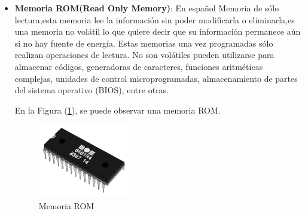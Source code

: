\documentclass{article}
\begin{document}
\begin{itemize}
    
    
    \item \textbf{Memoria ROM(Read Only Memory)}: En español Memoria de sólo lectura,esta memoria lee la información sin poder modificarla o eliminarla,es una memoria no volátil lo que quiere decir que su información permanece aún si no hay fuente de energía.\newline
    Estas memorias una vez programadas sólo realizan operaciones de lectura. No son volátiles pueden utilizarse para almacenar códigos, generadoras de caracteres, funciones aritméticas complejas, unidades de control microprogramadas, almacenamiento de partes del sistema operativo (BIOS), entre otras\cite{refUNT}.
    
    En la Figura (\ref{fig:rom}), se puede observar una memoria ROM.
    \begin{figure}[h]
    \includegraphics[width=4cm]{rom.png}
    \centering
    \caption{Memoria ROM}
    \label{fig:rom}
    \end{figure}
    
    
\end{itemize}
\end{document}
